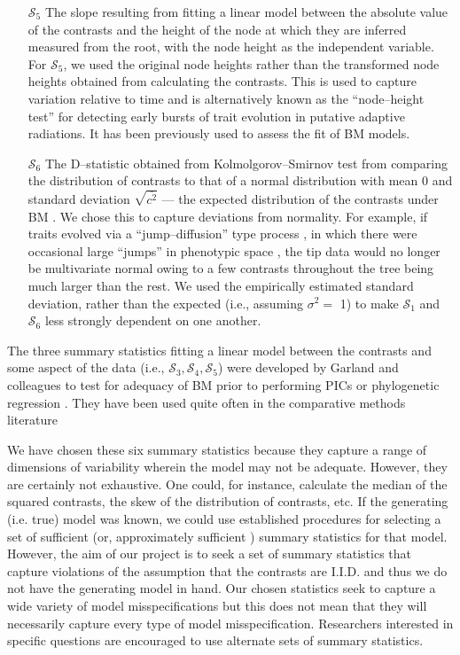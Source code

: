 \documentclass[a4paper,12pt]{article}
\begin{document}
\begin{enumerate}
\item[$\mathcal{S}_5$] The slope resulting from fitting a linear model between the absolute value of the contrasts and the height of the node at which they are inferred measured from the root, with the node height as the independent variable. For $\mathcal{S}_5$, we used the original node heights rather than the transformed node heights obtained from calculating the contrasts. This is used to capture variation relative to time and is alternatively known as the ``node--height test'' \citep{FreckletonHarvey2006} for detecting early bursts of trait evolution in putative adaptive radiations. It has been  previously used to assess the fit of BM models.

\item[$\mathcal{S}_6$] The D--statistic obtained from Kolmolgorov--Smirnov test from comparing the distribution of contrasts to that of a normal distribution with mean 0 and standard deviation $\sqrt{\overline{c^2}}$ --- the expected distribution of the contrasts under BM \citep{Felsenstein1985, Rohlf2001}. We chose this to capture deviations from normality. For example, if traits evolved via a ``jump--diffusion'' type process \citep{Landis2012}, in which there were occasional large ``jumps'' in phenotypic space \citep{PennellPE}, the tip data would no longer be multivariate normal owing to a few contrasts throughout the tree being much larger than the rest.  We used the empirically estimated standard deviation, rather than the expected (i.e., assuming $\sigma^2=$ 1) to make $\mathcal{S}_1$ and $\mathcal{S}_6$ less strongly dependent on one another.

\end{enumerate}

The three summary statistics fitting a linear model between the contrasts and some aspect of the data (i.e., $\mathcal{S}_3, \mathcal{S}_4, \mathcal{S}_5$) were developed by Garland and colleagues \citep{Garland1992, Garland1993,  Diaz1996} to test for adequacy of BM prior to performing PICs \citep{Felsenstein1985} or phylogenetic regression \citep{Grafen1989}. They have been used quite often in the comparative methods literature 

We have chosen these six summary statistics because they capture a range of dimensions of variability wherein the model may not be adequate. However, they are certainly not exhaustive. One could, for instance, calculate the median of the squared contrasts, the skew of the distribution of contrasts, etc. If the generating (i.e. true) model was known, we could use established procedures for selecting a set of sufficient (or, approximately sufficient \citep{MajoramJoyce}) summary statistics for that model. However, the aim of our project is to seek a set of summary statistics that capture violations of the assumption that the contrasts are I.I.D. and thus we do not have the generating model in hand. Our chosen statistics seek to capture a wide variety of model misspecifications but this does not mean that they will necessarily capture every type of model misspecification. Researchers interested in specific questions are encouraged to use alternate sets of summary statistics.
\end{document}
